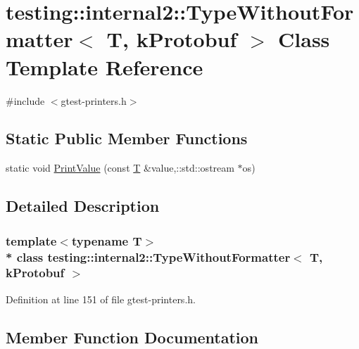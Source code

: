 \hypertarget{classtesting_1_1internal2_1_1_type_without_formatter_3_01_t_00_01k_protobuf_01_4}{}\section{testing\+:\+:internal2\+:\+:Type\+Without\+Formatter$<$ T, k\+Protobuf $>$ Class Template Reference}
\label{classtesting_1_1internal2_1_1_type_without_formatter_3_01_t_00_01k_protobuf_01_4}


{\ttfamily \#include $<$gtest-\/printers.\+h$>$}

\subsection*{Static Public Member Functions}
\begin{DoxyCompactItemize}
\item 
static void \hyperlink{classtesting_1_1internal2_1_1_type_without_formatter_3_01_t_00_01k_protobuf_01_4_a714da93952c590db954228bd9cc60abf}{Print\+Value} (const \hyperlink{functions__7_8js_adf1f3edb9115acb0a1e04209b7a9937b}{T} \&value,\+::std\+::ostream $\ast$os)
\end{DoxyCompactItemize}


\subsection{Detailed Description}
\subsubsection*{template$<$typename T$>$\\*
class testing\+::internal2\+::\+Type\+Without\+Formatter$<$ T, k\+Protobuf $>$}



Definition at line 151 of file gtest-\/printers.\+h.



\subsection{Member Function Documentation}
